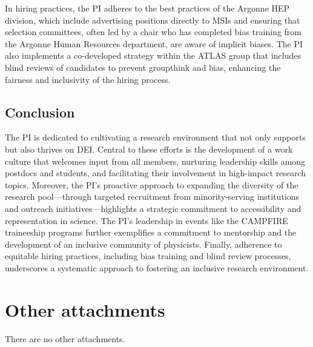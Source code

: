 \documentclass[letter, USenglish, 11pt, subfigure]{article}
\begin{document}
In hiring practices, the PI adheres to the best practices of the Argonne HEP division, which include advertising positions directly to MSIs and ensuring that selection committees, often led by a chair who has completed bias training from the Argonne Human Resources department, are aware of implicit biases. The PI also implements a co-developed strategy within the ATLAS group that includes blind reviews of candidates to prevent groupthink and bias, enhancing the fairness and inclusivity of the hiring process.

\subsection{Conclusion}

The PI is dedicated to cultivating a research environment that not only supports but also thrives on DEI. Central to these efforts is the development of a work culture that welcomes input from all members, nurturing leadership skills among postdocs and students, and facilitating their involvement in high-impact research topics. Moreover, the PI's proactive approach to expanding the diversity of the research pool—through targeted recruitment from minority-serving institutions and outreach initiatives—highlights a strategic commitment to accessibility and representation in science. The PI's leadership in events like the CAMPFIRE traineeship programs further exemplifies a commitment to mentorship and the development of an inclusive community of physicists. Finally, adherence to equitable hiring practices, including bias training and blind review processes, underscores a systematic approach to fostering an inclusive research environment.

\clearpage

\section{Other attachments}
There are no other attachments.
\end{document}
